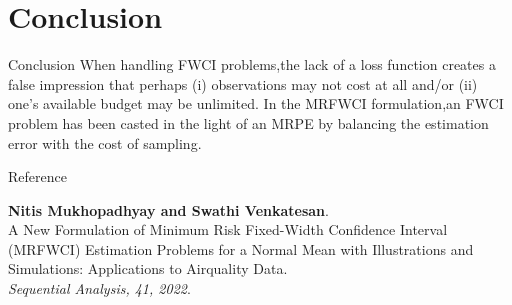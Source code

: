 \documentclass [xcolor=svgnames, t] {beamer}
\begin{document}
\section{Conclusion}
\begin{frame}{Conclusion}
\vspace{10mm}
When handling FWCI problems,the lack of a loss function creates a false impression that perhaps (i) observations may not cost at all and/or (ii) one's available budget may be unlimited. In the MRFWCI formulation,an FWCI problem has been casted in the light of an MRPE by balancing the estimation error with the cost of sampling.
\end{frame}

\begin{frame}[allowframebreaks]{Reference}
%
%

\textbf{Nitis Mukhopadhyay and Swathi Venkatesan}.\\
\vspace{0.2cm}
A New Formulation of Minimum Risk Fixed-Width Confidence Interval
(MRFWCI) Estimation Problems for a Normal Mean with Illustrations
and Simulations: Applications to Airquality Data.\\
\textit{Sequential Analysis, 41, 2022}.

\end{frame}
\end{document}
